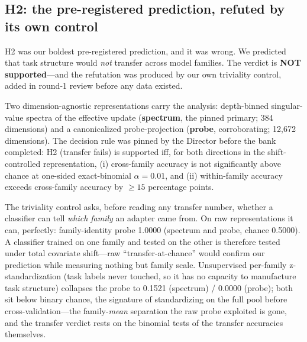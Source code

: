\documentclass{article}
\begin{document}
\subsection{H2: the pre-registered prediction, refuted by its own control}
\label{sec:h2}

H2 was our boldest pre-registered prediction, and it was wrong. We
predicted that task structure would \emph{not} transfer across model
families. The verdict is \textbf{NOT supported}---and the refutation was
produced by our own triviality control, added in round-1 review before any
data existed.

Two dimension-agnostic representations carry the analysis: depth-binned
singular-value spectra of the effective update (\textbf{spectrum}, the
pinned primary; 384 dimensions) and a canonicalized probe-projection
(\textbf{probe}, corroborating; 12{,}672 dimensions). The decision rule was
pinned by the Director before the bank completed: H2 (transfer fails) is
supported iff, for both directions in the shift-controlled representation,
(i) cross-family accuracy is not significantly above chance at one-sided
exact-binomial $\alpha = 0.01$, and (ii) within-family accuracy exceeds
cross-family accuracy by $\ge 15$ percentage points.

The triviality control asks, before reading any transfer number, whether a
classifier can tell \emph{which family} an adapter came from. On raw
representations it can, perfectly: family-identity probe 1.0000 (spectrum
and probe, chance 0.5000). A classifier trained on one family and tested
on the other is therefore tested under total covariate shift---raw
``transfer-at-chance'' would confirm our prediction while measuring
nothing but family scale. Unsupervised per-family z-standardization
(task labels never touched, so it has no capacity to manufacture task
structure) collapses the probe to 0.1521 (spectrum) / 0.0000 (probe);
both sit below binary chance, the signature of standardizing on the full
pool before cross-validation---the family-\emph{mean} separation the raw
probe exploited is gone, and the transfer verdict rests on the binomial
tests of the transfer accuracies themselves.
\end{document}
